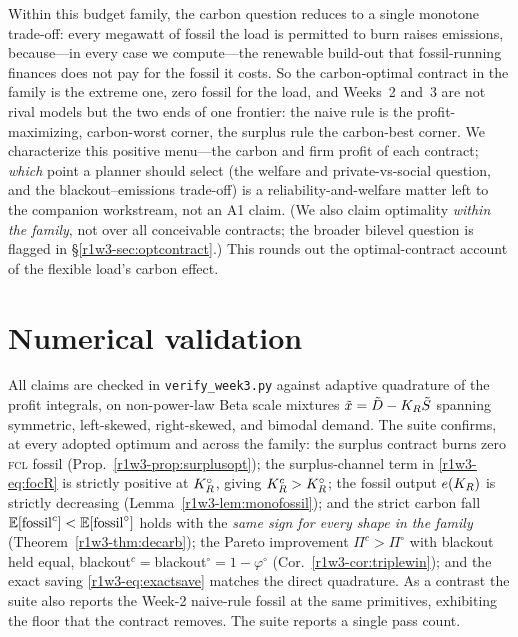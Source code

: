 \begin{remark}
Within this budget family, the carbon question reduces to a single monotone trade-off:
every megawatt of fossil the load is permitted to burn raises emissions, because---in
every case we compute---the renewable build-out that fossil-running finances does not
pay for the fossil it costs. So the carbon-optimal contract in the family is the extreme
one, zero fossil for the load, and Weeks~2 and~3 are not rival models but the two ends of
one frontier: the naive rule is the profit-maximizing, carbon-worst corner, the surplus
rule the carbon-best corner. We characterize this positive menu---the carbon and firm
profit of each contract; \emph{which} point a planner should select (the welfare and
private-vs-social question, and the blackout--emissions trade-off) is a
reliability-and-welfare matter left to the companion workstream, not an A1 claim. (We
also claim optimality \emph{within the family}, not over all conceivable contracts; the
broader bilevel question is flagged in \S\ref{r1w3-sec:optcontract}.) This rounds out the
optimal-contract account of the flexible load's carbon effect.
\end{remark}

\section{Numerical validation}\label{r1w3-sec:num}

All claims are checked in \texttt{verify\_week3.py} against adaptive quadrature of the
profit integrals, on non-power-law Beta scale mixtures
$\tilde x=\tilde D-K_R\tilde S$ spanning symmetric, left-skewed, right-skewed, and
bimodal demand. The suite confirms, at every adopted optimum and across the family:
the surplus contract burns zero \textsc{fcl} fossil (Prop.~\ref{r1w3-prop:surplusopt}); the
surplus-channel term in \eqref{r1w3-eq:focR} is strictly positive at $K_R^{\circ}$, giving
$K_R^{c}>K_R^{\circ}$; the fossil output $e(K_R)$ is strictly decreasing
(Lemma~\ref{r1w3-lem:monofossil}); and the strict carbon fall
$\mathbb{E}[\mathrm{fossil}^{c}]<\mathbb{E}[\mathrm{fossil}^{\circ}]$ holds with the \emph{same sign for every shape in
the family} (Theorem~\ref{r1w3-thm:decarb}); the Pareto improvement $\Pi^{c}>\Pi^{\circ}$
with blackout held equal, blackout$^{c}=$blackout$^{\circ}=1-\varphi^{\circ}$
(Cor.~\ref{r1w3-cor:triplewin}); and the exact saving \eqref{r1w3-eq:exactsave} matches the direct
quadrature. As a contrast the suite also
reports the Week-2 naive-rule fossil at the same primitives, exhibiting the floor that
the contract removes. The suite reports a single pass count.

